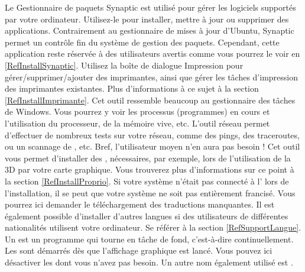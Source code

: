 Le Gestionnaire de paquets Synaptic est utilisé pour gérer les logiciels supportés par votre ordinateur. Utilisez-le pour installer, mettre à jour ou supprimer des applications. Contrairement au gestionnaire de mises à jour d'Ubuntu, Synaptic permet un contrôle fin du système de gestion des paquets. Cependant, cette application reste réservée à des utilisateurs avertis comme vous pourrez le voir en \ref{RefInstallSynaptic}.
Utilisez la boîte de dialogue Impression pour gérer/supprimer/ajouter des imprimantes, ainsi que gérer les tâches d'impression des imprimantes existantes. Plus d'informations à ce sujet à la section \ref{RefInstallImprimante}.
Cet outil ressemble beaucoup au gestionnaire des tâches de Windows. Vous pourrez y voir les processus (programmes) en cours et l'utilisation du processeur, de la mémoire vive, etc.
L'outil réseau permet d'effectuer de nombreux tests sur votre réseau, comme des pings, des traceroutes, ou un scannage de , etc. Bref, l'utilisateur moyen n'en aura pas besoin !
Cet outil vous permet d'installer des  , nécessaires, par exemple, lors de l'utilisation de la 3D par votre carte graphique. Vous trouverez plus d'informations sur ce point à la section \ref{RefInstallProprio}.
Si votre système n'était pas connecté à l' lors de l'installation, il se peut que votre système ne soit pas entièrement francisé. Vous pourrez ici demander le téléchargement des traductions manquantes. Il est également possible d'installer d'autres langues si des utilisateurs de différentes nationalités utilisent votre ordinateur. Se référer à la section \ref{RefSupportLangue}.
Un  est un programme qui tourne en tâche de fond, c'est-à-dire continuellement. Les  sont démarrés dès que l'affichage graphique est lancé. Vous pouvez ici désactiver les  dont vous n'avez pas besoin. Un autre nom également utilisé est .
